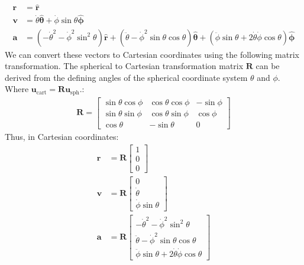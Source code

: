\documentclass[letterpaper,11pt,english]{sphinxmanual}
\begin{document}
\begin{equation*}
\begin{split}\mathbf{r} &= \mathbf{\hat r} \\
\mathbf{v} &=  \dot\theta \hat{\boldsymbol\theta } + \dot\phi \sin\theta \mathbf{\hat{\boldsymbol\phi}} \\
\mathbf{a} &= \left(-\dot\theta^2 - \dot\phi^2\sin^2\theta \right) \mathbf{\hat r} + \left(\ddot\theta - \dot\phi^2\sin\theta\cos\theta \right) \hat{\boldsymbol\theta } + \left(\ddot\phi\sin\theta  + 2 \dot\theta\dot\phi\cos\theta \right) \hat{\boldsymbol\phi}\end{split}
\end{equation*}
\sphinxAtStartPar
We can convert these vectors to Cartesian coordinates using the following
matrix transformation. The spherical to Cartesian transformation matrix
\(\mathbf{R}\) can be derived from the defining angles of the spherical
coordinate system \(\theta\) and \(\phi\). Where
\(\mathbf{u}_\text{cart} = \mathbf{R} \mathbf{u}_\text{sph}\).:
\begin{equation*}
\begin{split}\mathbf{R} = \begin{bmatrix}
\sin\theta\cos\phi & \cos\theta\cos\phi & -\sin\phi \\
\sin\theta\sin\phi & \cos\theta\sin\phi &  \cos\phi \\
\cos\theta         & -\sin\theta        & 0
\end{bmatrix}\end{split}
\end{equation*}
\sphinxAtStartPar
Thus, in Cartesian coordinates:
\begin{equation*}
\begin{split}\mathbf{r} &= \mathbf{R} \begin{bmatrix} 1 \\ 0 \\ 0 \end{bmatrix} \\
\mathbf{v} &= \mathbf{R} \begin{bmatrix} 0 \\ \dot\theta \\ \dot\phi \sin\theta \end{bmatrix} \\
\mathbf{a} &= \mathbf{R} \begin{bmatrix} -\dot\theta^2 - \dot\phi^2\sin^2\theta \\ \ddot\theta - \dot\phi^2\sin\theta\cos\theta \\ \ddot\phi\sin\theta  + 2 \dot\theta\dot\phi\cos\theta \end{bmatrix}\end{split}
\end{equation*}
\end{document}
